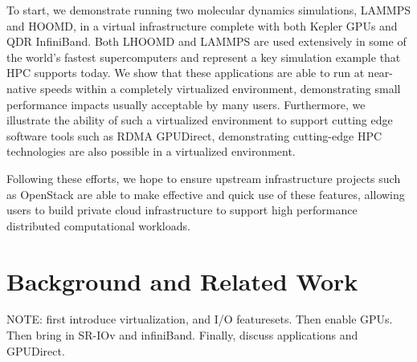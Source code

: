 \documentclass{sigplanconf}
\begin{document}
To start, we demonstrate running two molecular dynamics simulations, LAMMPS and HOOMD, in a virtual infrastructure complete with both Kepler GPUs and QDR InfiniBand.  Both LHOOMD and LAMMPS are used extensively in some of the world's fastest supercomputers and represent a key simulation example that HPC supports today.  We show that these applications are able to run at near-native speeds within a completely virtualized environment, demonstrating small performance impacts usually acceptable by many users. Furthermore, we illustrate the ability of such a virtualized environment to support cutting edge software tools such as RDMA GPUDirect, demonstrating cutting-edge HPC technologies are also possible in a virtualized environment. 

Following these efforts, we hope to ensure upstream infrastructure projects such as OpenStack \cite{www-openstack, pepple2011deploying} are able to make effective and quick use of these features, allowing users to build private cloud infrastructure to support high performance distributed computational workloads. 





 


\section{Background and Related Work}

NOTE: first introduce virtualization, and I/O featuresets. Then enable GPUs. Then bring in SR-IOv and infiniBand. Finally, discuss applications and GPUDirect.
\end{document}
